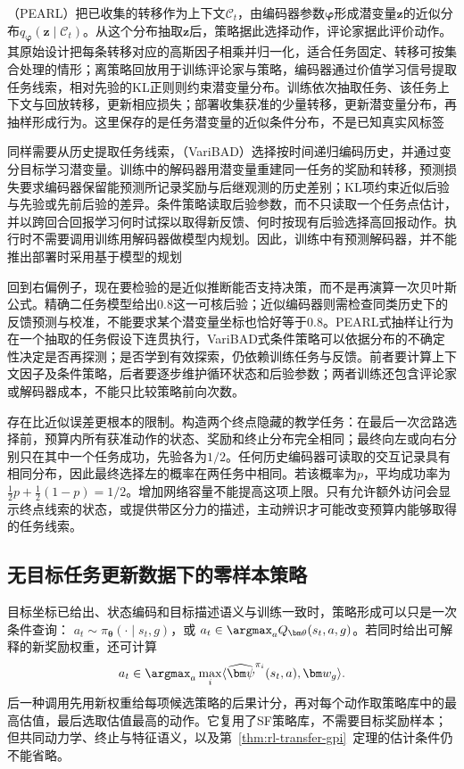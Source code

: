 （PEARL）把已收集的转移作为上下文$\mathcal C_t$，由编码器参数$\bm\varphi$形成潜变量$\bm z$的近似分布$q_{\bm\varphi}(\bm z\mid\mathcal C_t)$。从这个分布抽取$\bm z$后，策略据此选择动作，评论家据此评价动作。其原始设计把每条转移对应的高斯因子相乘并归一化，适合任务固定、转移可按集合处理的情形；离策略回放用于训练评论家与策略，编码器通过价值学习信号提取任务线索，相对先验的KL正则则约束潜变量分布。训练依次抽取任务、该任务上下文与回放转移，更新相应损失；部署收集获准的少量转移，更新潜变量分布，再抽样形成行为。这里保存的是任务潜变量的近似条件分布，不是已知真实风标签

同样需要从历史提取任务线索，（VariBAD）选择按时间递归编码历史，并通过变分目标学习潜变量。训练中的解码器用潜变量重建同一任务的奖励和转移，预测损失要求编码器保留能预测所记录奖励与后继观测的历史差别；KL项约束近似后验与先验或先前后验的差异。条件策略读取后验参数，而不只读取一个任务点估计，并以跨回合回报学习何时试探以取得新反馈、何时按现有后验选择高回报动作。执行时不需要调用训练用解码器做模型内规划。因此，训练中有预测解码器，并不能推出部署时采用基于模型的规划

回到右偏例子，现在要检验的是近似推断能否支持决策，而不是再演算一次贝叶斯公式。精确二任务模型给出$0.8$这一可核后验；近似编码器则需检查同类历史下的反馈预测与校准，不能要求某个潜变量坐标也恰好等于$0.8$。PEARL式抽样让行为在一个抽取的任务假设下连贯执行，VariBAD式条件策略可以依据分布的不确定性决定是否再探测；是否学到有效探索，仍依赖训练任务与反馈。前者要计算上下文因子及条件策略，后者要逐步维护循环状态和后验参数；两者训练还包含评论家或解码器成本，不能只比较策略前向次数。

存在比近似误差更根本的限制。构造两个终点隐藏的教学任务：在最后一次岔路选择前，预算内所有获准动作的状态、奖励和终止分布完全相同；最终向左或向右分别只在其中一个任务成功，先验各为$1/2$。任何历史编码器可读取的交互记录具有相同分布，因此最终选择左的概率在两任务中相同。若该概率为$p$，平均成功率为$\tfrac12p+\tfrac12(1-p)=1/2$。增加网络容量不能提高这项上限。只有允许额外访问会显示终点线索的状态，或提供带区分力的描述，主动辨识才可能改变预算内能够取得的任务线索。

\subsection{无目标任务更新数据下的零样本策略}
\label{sec:rl-transfer-zero-shot}

目标坐标已给出、状态编码和目标描述语义与训练一致时，策略形成可以只是一次条件查询：
$a_t\sim\pi_{\bm\theta}(\cdot\mid s_t,g)$，或
$a_t\in\argmax_a Q_{\bm\theta}(s_t,a,g)$。若同时给出可解释的新奖励权重，还可计算
\[
 a_t\in\argmax_a\max_i
 \langle\widehat{\bm\psi}^{\pi_i}(s_t,a),\bm w_g\rangle.
\]
后一种调用先用新权重给每项候选策略的后果计分，再对每个动作取策略库中的最高估值，最后选取估值最高的动作。它复用了SF策略库，不需要目标奖励样本；但共同动力学、终止与特征语义，以及第~\ref{thm:rl-transfer-gpi}~定理的估计条件仍不能省略。

